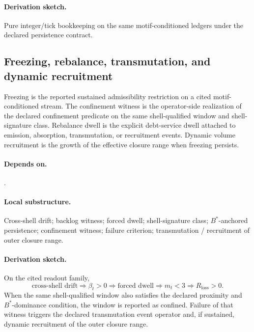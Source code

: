 \paragraph{Derivation sketch.} Pure integer/tick bookkeeping on the same motif-conditioned ledgers under the declared persistence contract.

\subsection{Freezing, rebalance, transmutation, and dynamic recruitment}\label{subsec:freeze-rebalance-recruitment}
\begin{definition}
\label{def:freezing-operator}
Freezing is the reported sustained admissibility restriction on a cited motif-conditioned stream. The confinement witness is the operator-side realization of the declared confinement predicate on the same shell-qualified window and shell-signature class. Rebalance dwell is the explicit debt-service dwell attached to emission, absorption, transmutation, or recruitment events. Dynamic volume recruitment is the growth of the effective closure range when freezing persists.
\end{definition}

\paragraph{Depends on.} .
\paragraph{Local substructure.} Cross-shell drift; backlog witness; forced dwell; shell-signature class; $B^*$-anchored persistence; confinement witness; failure criterion; transmutation / recruitment of outer closure range.
\paragraph{Derivation sketch.} On the cited readout family,
\[
\text{cross-shell drift}\Rightarrow \beta_t>0\Rightarrow \text{forced dwell}\Rightarrow m_t<3\Rightarrow R_{\mathrm{loss}}>0.
\]
When the same shell-qualified window also satisfies the declared proximity and $B^*$-dominance condition, the window is reported as confined. Failure of that witness triggers the declared transmutation event operator and, if sustained, dynamic recruitment of the outer closure range.

